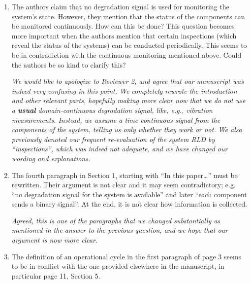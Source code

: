 \documentclass[authoryear]{elsarticle}
\begin{document}
\begin{enumerate}
\item The authors claim that no degradation signal is used for monitoring the system’s state. However, they mention that the status of the components can be monitored continuously. How can this be done? This question becomes more important when the authors mention that certain inspections (which reveal the status of the systems) can be conducted periodically. This seems to be in contradiction with the continuous monitoring mentioned above. Could the authors be so kind to clarify this?

\smallskip

\emph{We would like to apologize to Reviewer 2,
and agree that our manuscript was indeed very confusing in this point.
We completely rewrote the introduction and other relevant parts,
hopefully making more clear now that 
we do not use a \textbf{usual} domain-continuous degradation signal, like, e.g., vibration measurements.
Instead, we assume a time-continuous signal from the components of the system, telling us only whether they work or not.
We also previously denoted our frequent re-evaluation of the system RLD by ``inspections'',
which was indeed not adequate, and we have changed our wording and explanations.}

\item The fourth paragraph in Section 1, starting with “In this paper…” must be rewritten. Their argument is not clear and it may seem contradictory; e.g. “no degradation signal for the system is available” and later “each component sends a binary signal”. At the end, it is not clear how information is collected.

\smallskip

\emph{Agreed, this is one of the paragraphs that we changed substantially as mentioned in the answer to the previous question,
and we hope that our argument is now more clear.}

\item The definition of an operational cycle in the first paragraph of page 3 seems to be in conflict with the one provided elsewhere in the manuscript, in particular page 11, Section 5.


\end{enumerate}
\end{document}
